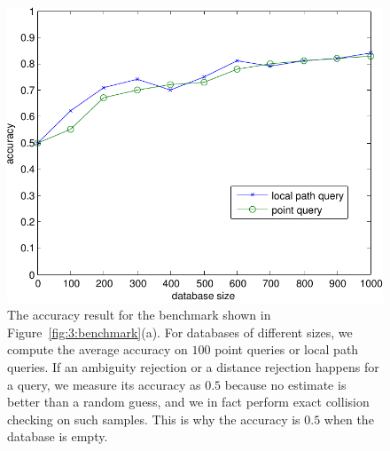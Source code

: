 \begin{figure}[!h]
  \centering
  \includegraphics[width=0.8\linewidth]{figs/3/accuracy-crop.pdf}
  \caption[The accuracy of the instance-based learning framework on various benchmarks.]{\label{fig:3:accuracy} The accuracy result for the benchmark shown in Figure~\ref{fig:3:benchmark}(a). For databases of different sizes, we compute the average accuracy on $100$ point queries or local path queries. If an ambiguity rejection or a distance rejection happens for a query, we measure its accuracy as $0.5$ because no estimate is better than a random guess, and we in fact perform exact collision checking on such samples. This is why the accuracy is $0.5$ when the database is empty.}
\end{figure}




